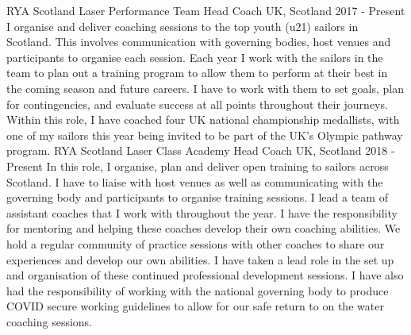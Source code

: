 \documentclass[11pt, a4paper]{awesome-cv}
\begin{document}
\begin{cventries}
  \cventry
    {RYA Scotland} %
    {Laser Performance Team Head Coach} %
    {UK, Scotland} %
    {2017 - Present} %
    {
        I organise and deliver coaching sessions to the top youth (u21) sailors in Scotland. This involves communication with governing bodies, host venues and participants to organise each session. Each year I work with the sailors in the team to plan out a training program to allow them to perform at their best in the coming season and future careers. I have to work with them to set goals, plan for contingencies, and evaluate success at all points throughout their journeys.\newline
        Within this role, I have coached four UK national championship medallists, with one of my sailors this year being invited to be part of the UK's Olympic pathway program.\newline
     }
       \cventry
    {RYA Scotland} %
    {Laser Class Academy Head Coach} %
    {UK, Scotland} %
    {2018 - Present} %
    {
        In this role, I organise, plan and deliver open training to sailors across Scotland. I have to liaise with host venues as well as communicating with the governing body and participants to organise training sessions. I lead a team of assistant coaches that I work with throughout the year. I have the responsibility for mentoring and helping these coaches develop their own coaching abilities. We hold a regular community of practice sessions with other coaches to share our experiences and develop our own abilities. I have taken a lead role in the set up and organisation of these continued professional development sessions.\newline
        I have also had the responsibility of working with the national governing body to produce COVID secure working guidelines to allow for our safe return to on the water coaching sessions.\newline
    }

\end{cventries}




\end{document}
